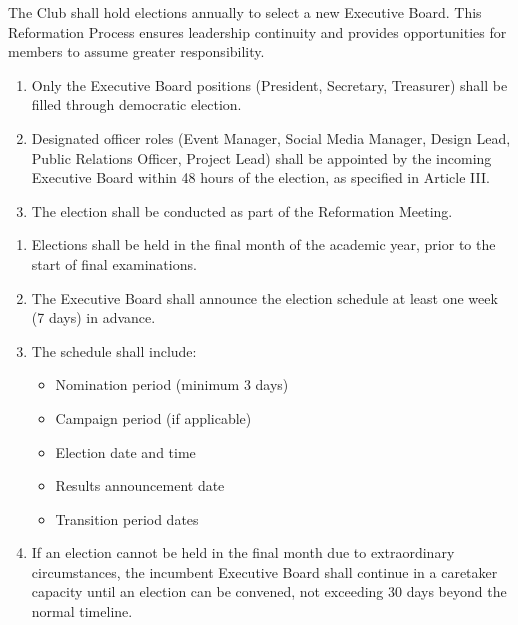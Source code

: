 

The Club shall hold elections annually to select a new Executive Board. This Reformation Process ensures leadership continuity and provides opportunities for members to assume greater responsibility.

\begin{enumerate}[label=\alph*), leftmargin=2em, itemsep=0.3em]
    \item Only the Executive Board positions (President, Secretary, Treasurer) shall be filled through democratic election.
    
    \item Designated officer roles (Event Manager, Social Media Manager, Design Lead, Public Relations Officer, Project Lead) shall be appointed by the incoming Executive Board within 48 hours of the election, as specified in Article III.
    
    \item The election shall be conducted as part of the Reformation Meeting.
\end{enumerate}


\begin{enumerate}[label=\alph*), leftmargin=2em, itemsep=0.3em]
    \item Elections shall be held in the final month of the academic year, prior to the start of final examinations.
    
    \item The Executive Board shall announce the election schedule at least one week (7 days) in advance.
    
    \item The schedule shall include:
    \begin{itemize}[leftmargin=1.5em, itemsep=0.2em]
        \item Nomination period (minimum 3 days)
        \item Campaign period (if applicable)
        \item Election date and time
        \item Results announcement date
        \item Transition period dates
    \end{itemize}
    
    \item If an election cannot be held in the final month due to extraordinary circumstances, the incumbent Executive Board shall continue in a caretaker capacity until an election can be convened, not exceeding 30 days beyond the normal timeline.
\end{enumerate}

